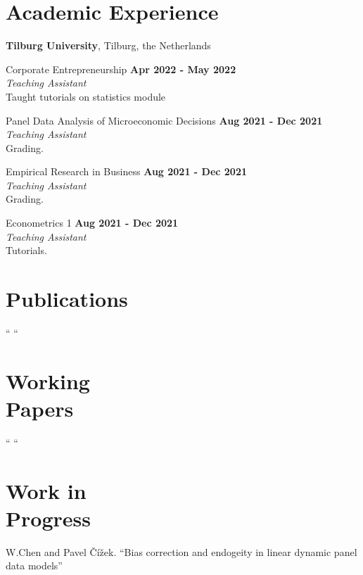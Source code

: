 \documentclass[margin,line]{res}
\begin{document}
\begin{resume}
\section{\sc Academic Experience}
{\bf Tilburg University}, Tilburg, the Netherlands

\vspace{-.3cm}
Corporate Entrepreneurship \hfill {\bf Apr 2022 - May 2022}\\
 {\em Teaching Assistant}\\
Taught tutorials on statistics module

\vspace{-.3cm}
Panel Data Analysis of Microeconomic Decisions \hfill {\bf Aug 2021 - Dec 2021}\\
{\em Teaching Assistant}\\
Grading.

\vspace{-.3cm}
Empirical Research in Business \hfill {\bf Aug 2021 - Dec 2021}\\
{\em Teaching Assistant}\\
Grading.

\vspace{-.3cm}
Econometrics 1 \hfill {\bf Aug 2021 - Dec 2021}\\
{\em Teaching Assistant}\\
Tutorials.

\section{\sc Publications}
`` ``

\section{\sc Working \\ Papers}
`` ``


\section{\sc Work in \\ Progress}
W.Chen and Pavel \v{C}ížek. ``Bias correction and endogeity in linear dynamic panel data models''


\end{resume}
\end{document}
